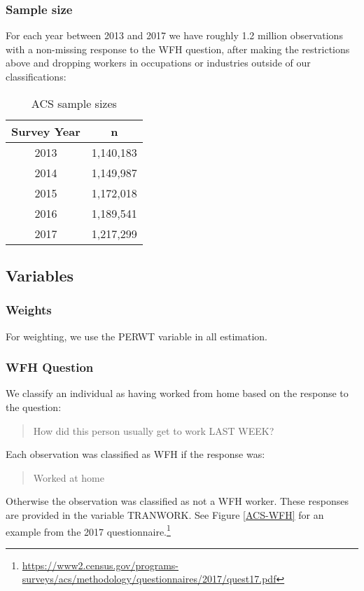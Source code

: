 \documentclass{article}
\begin{document}
\subsubsection{Sample size}
For each year between 2013 and 2017 we have roughly 1.2 million observations with a non-missing response to the WFH question, after making the restrictions above and dropping workers in occupations or industries outside of our classifications:

\begin{table}[ht]
\caption{ACS sample sizes}
\centering
\begin{tabular}{c | c}
\hline%
Survey Year & n \\
\hline %
2013 & 1,140,183  \\ %
2014 & 1,149,987 \\
2015 & 1,172,018 \\
2016 & 1,189,541 \\
2017 & 1,217,299 \\ [1ex] %
\end{tabular}
\label{table:ACS sample size} %
\end{table}

\subsection{Variables}
\subsubsection{Weights}
For weighting, we use the PERWT variable in all estimation.

\subsubsection{WFH Question}
We classify an individual as having worked from home based on the response to the question:
\begin{quote}
How did this person usually get to work LAST WEEK?
\end{quote}
Each observation was classified as WFH if the response was:
\begin{quote}
Worked at home
\end{quote}
Otherwise the observation was classified as not a WFH worker.
These responses are provided in the variable TRANWORK.
See Figure \ref{ACS-WFH} for an example from the 2017 questionnaire.\footnote{\url{https://www2.census.gov/programs-surveys/acs/methodology/questionnaires/2017/quest17.pdf}}
\end{document}
